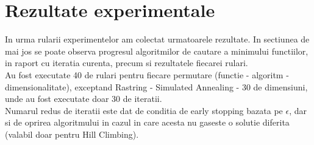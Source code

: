 \documentclass{article}
\begin{document}
\section{Rezultate experimentale} 
In urma rularii experimentelor am colectat urmatoarele rezultate. In sectiunea de mai jos se poate observa progresul algoritmilor de cautare a minimului functiilor, in raport cu iteratia curenta, precum si rezultatele fiecarei rulari. \\
Au fost executate 40 de rulari pentru fiecare permutare (functie - algoritm - dimensionalitate), exceptand Rastring - Simulated Annealing - 30 de dimensiuni, unde  au fost executate doar 30 de iteratii. \\
Numarul redus de iteratii este dat de conditia de early stopping bazata pe $\epsilon$, dar si de oprirea algoritmului in cazul in care acesta nu gaseste o solutie diferita (valabil doar pentru Hill Climbing).
\clearpage
\end{document}
